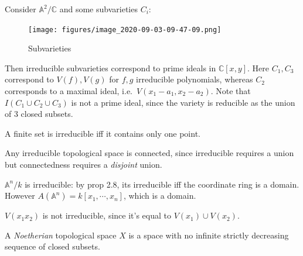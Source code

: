 \begin{example}

Consider \({\mathbb{A}}^2/{\mathbb{C}}\) and some subvarieties \(C_i\):

\begin{figure}
\centering
\texttt{[image: figures/image\_2020-09-03-09-47-09.png]}
\caption{Subvarieties}
\end{figure}

Then irreducible subvarieties correspond to prime ideals in
\({\mathbb{C}}[x, y]\). Here \(C_1, C_3\) correspond to \(V(f), V(g)\)
for \(f,g\) irreducible polynomials, whereas \(C_2\) corresponds to a
maximal ideal, i.e.~\(V(x_1 - a_1, x_2 - a_2)\). Note that
\(I(C_1 \cup C_2 \cup C_3)\) is not a prime ideal, since the variety is
reducible as the union of 3 closed subsets.

\end{example}

\begin{example}

A finite set is irreducible iff it contains only one point.

\end{example}

\begin{example}

Any irreducible topological space is connected, since irreducible
requires a union but connectedness requires a \emph{disjoint} union.

\end{example}

\begin{example}

\({\mathbb{A}}^n/k\) is irreducible: by prop 2.8, its irreducible iff
the coordinate ring is a domain. However
\(A({\mathbb{A}}^n) = k[x_1, \cdots, x_n]\), which is a domain.

\end{example}

\begin{example}

\(V(x_1 x_2)\) is not irreducible, since it's equal to
\(V(x_1) \cup V(x_2)\).

\end{example}

\begin{definition}

A \emph{Noetherian} topological space \(X\) is a space with no infinite
strictly decreasing sequence of closed subsets.

\end{definition}

